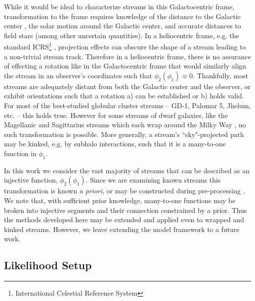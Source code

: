 \documentclass[twocolumn]{aastex631}
\newcommand{\stream}[1]{#1}
\begin{document}
        While it would be ideal to characterize streams in this Galactocentric
        frame, transformation to the frame requires knowledge of the distance to
        the Galactic center  \citep{GRAVITY2018, BennettBovy2019, Leung+2022},
        the solar motion around the Galactic center, and accurate distances to
        field stars (among other uncertain quantities). In a heliocentric frame,
        e.g. the standard ICRS\footnote{International Celestial Reference
        System} \citep{ICRS1997}, projection effects can obscure the shape of a
        stream leading to a non-trivial stream track. Therefore in a
        heliocentric frame, there is no assurance of effecting a rotation like
        in the Galactocentric frame that would similarly align the stream in an
        observer's coordinates such that $\phi_2(\phi_1) \approx 0$.
        Thankfully, most streams are adequately distant from both the Galactic
        center and the observer, or exhibit orientations such that a rotation a)
        can be established or b) holds valid. For most of the best-studied
        globular cluster streams -- \stream{GD-1}, \stream{Palomar 5},
        \stream{Jhelum}, etc. -- this holds true. However for some streams of
        dwarf galaxies, like the Magellanic and Sagittarius streams which each
        wrap around the Milky Way \citep{Newberg+2002, Majewski+2003,
        WannierWrixon1972}, no such transformation is possible. More generally,
        a stream's ``sky"-projected path may be kinked, e.g. by subhalo
        interactions, such that it is a many-to-one function in $\phi_1$.

        In this work we consider the vast majority of streams that can be
        described as an injective function, $\phi_2(\phi_1)$.  Since we are
        examining known streams this transformation is known \textit{a priori},
        or may be constructed during pre-processing
        \citep[see][\S2.1]{Starkman+2023}.  We note that, with sufficient prior
        knowledge, many-to-one functions may be broken into injective segments
        and their connection constrained by a prior. Thus the methods developed
        here may be extended and applied even to wrapped and kinked streams.
        However, we leave extending the model framework to a future work.

    \subsection{Likelihood Setup}\label{sub:method:likelihood_setup}
\end{document}
